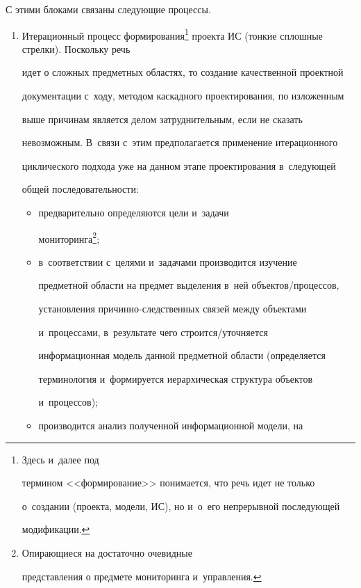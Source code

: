      


     С этими блоками связаны следующие процессы.


     \begin{enumerate}[1.]


     \item Итерационный процесс формирования\footnote[1]{Здесь и~далее под 


термином <<формирование>> понимается, что речь идет не только 


о~создании (проекта, модели, ИС), но и~о~его непрерывной последующей 


модификации.} проекта ИС (тонкие сплошные стрел\-ки). Поскольку речь 


идет о сложных предметных областях, то создание качественной проектной 


документации с~ходу, методом каскадного проектирования, по изложенным 


выше причинам является делом затруднительным, если не сказать 


невозможным. В~связи с~этим предполагается применение итерационного 


циклического подхода уже на данном этапе проектирования в~следующей 


общей последовательности:


     \begin{itemize}


     \item[(а)] предварительно определяются цели и~задачи 


мониторинга\footnote[2]{Опирающиеся на достаточно очевидные 


представления о предмете мониторинга и~управления.};


     \item[(б)] в~соответствии с~целями и~задачами производится изучение 


предметной области на предмет выделения в~ней объектов\!/\!процессов, 


установ\-ле\-ния при\-чин\-но-след\-ст\-вен\-ных связей между объектами 


и~процессами, в~результате чего стро\-ит\-ся/уточ\-ня\-ет\-ся 


информационная модель данной предметной области (определяется 


терминология и~формируется иерархическая структура объектов 


и~процессов);


     \item[(в)] производится анализ полученной информационной модели, на 



\end{itemize}
\end{enumerate}
